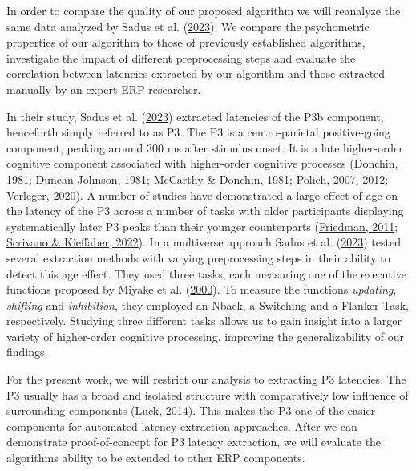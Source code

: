\documentclass[
  man]{apa7}
\begin{document}
In order to compare the quality of our proposed algorithm we will reanalyze the same data analyzed by Sadus et al. (\protect\hyperlink{ref-sadus2023multiverse}{2023}). We compare the psychometric properties of our algorithm to those of previously established algorithms, investigate the impact of different preprocessing steps and evaluate the correlation between latencies extracted by our algorithm and those extracted manually by an expert ERP researcher.

In their study, Sadus et al. (\protect\hyperlink{ref-sadus2023multiverse}{2023}) extracted latencies of the P3b component, henceforth simply referred to as P3. The P3 is a centro-parietal positive-going component, peaking around 300 ms after stimulus onset. It is a late higher-order cognitive component associated with higher-order cognitive processes (\protect\hyperlink{ref-donchin1981surprise}{Donchin, 1981}; \protect\hyperlink{ref-duncan1981young}{Duncan-Johnson, 1981}; \protect\hyperlink{ref-mccarthy1981metric}{McCarthy \& Donchin, 1981}; \protect\hyperlink{ref-polich2007updating}{Polich, 2007}, \protect\hyperlink{ref-polich2012neuropsychology}{2012}; \protect\hyperlink{ref-verleger2020effects}{Verleger, 2020}). A number of studies have demonstrated a large effect of age on the latency of the P3 across a number of tasks with older participants displaying systematically later P3 peaks than their younger counterparts (\protect\hyperlink{ref-friedman2012components}{Friedman, 2011}; \protect\hyperlink{ref-scrivano2022behavioral}{Scrivano \& Kieffaber, 2022}). In a multiverse approach Sadus et al. (\protect\hyperlink{ref-sadus2023multiverse}{2023}) tested several extraction methods with varying preprocessing steps in their ability to detect this age effect. They used three tasks, each measuring one of the executive functions proposed by Miyake et al. (\protect\hyperlink{ref-miyake2000unity}{2000}). To measure the functions \emph{updating}, \emph{shifting} and \emph{inhibition}, they employed an Nback, a Switching and a Flanker Task, respectively. Studying three different tasks allows us to gain insight into a larger variety of higher-order cognitive processing, improving the generalizability of our findings.

For the present work, we will restrict our analysis to extracting P3 latencies. The P3 usually has a broad and isolated structure with comparatively low influence of surrounding components (\protect\hyperlink{ref-luck2014introduction}{Luck, 2014}). This makes the P3 one of the easier components for automated latency extraction approaches. After we can demonstrate proof-of-concept for P3 latency extraction, we will evaluate the algorithms ability to be extended to other ERP components.
\end{document}

